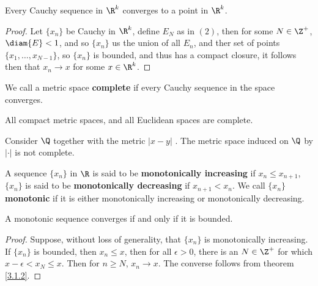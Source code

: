 \begin{corollary}
  Every Cauchy sequence in $\R^k$ converges to a point in  $\R^k$.
\end{corollary}
\begin{proof}
  Let $\{x_n\}$ be Cauchy in  $\R^k$, define $E_N$ as in  $(2)$, then for some  $N \in \Z^+$,
  $\diam{E}<1$, and so  $\{x_n\}$ us the union of all  $E_n$, and ther set of points
  $\{x_1,\dots, x_{N-1}\}$, so $\{x_n\}$ is bounded, and thus has a compact closure, it follows then
  that  $x_n \rightarrow x$ for some  $x \in \R^k$.
\end{proof}

\begin{definition}
  We call a metric space \textbf{complete} if every Cauchy sequence in the space converges.
\end{definition}

\begin{theorem}\label{3.3.4}
  All compact metric spaces, and all Euclidean spaces are complete.
\end{theorem}

\begin{example}
  Consider $\Q$ together with the metric  $|x-y|$	. The metric space induced on $\Q$ by  $|\cdot|$ is
  not complete.
\end{example}

\begin{definition}
  A sequence $\{x_n\}$ in $\R$ is said to be \textbf{monotonically increasing} if
  $x_n \leq x_{n+1}$, $\{x_n\}$ is said to be \textbf{monotonically decreasing} if $x_{n+1}<x_n$.
  We call  $\{x_n\}$ \textbf{monotonic} if it is either monotonically increasing or monotonically
  decreasing.
\end{definition}

\begin{theorem}\label{3.3.5}
  A monotonic sequence converges if and only if it is bounded.
\end{theorem}
\begin{proof}
  Suppose, without loss of generality, that $\{x_n\}$ is monotonically increasing. If
  $\{x_n\}$ is bounded, then  $x_n \leq x$, then for all  $\epsilon>0$, there is an  $N \in \Z^+$
  for which  $x-\epsilon<x_N \leq x$. Then for  $n \geq N$,  $x_n \rightarrow x$. The converse follows
  from theorem  \ref{3.1.2}.
\end{proof}
